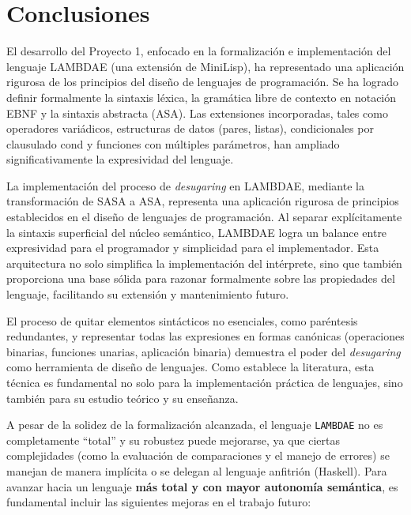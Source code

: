 \documentclass[a4paper,12pt]{article}
\begin{document}

\newpage

\section{Conclusiones}

\begin{tcolorbox}[title= Conclusiones     MÓDULO D3, breakable]
    El desarrollo del Proyecto 1, enfocado en la formalización e implementación del lenguaje LAMBDAE (una extensión de MiniLisp), ha representado una aplicación rigurosa de los principios del diseño de lenguajes de programación. Se ha logrado definir formalmente la sintaxis léxica, la gramática libre de contexto en notación EBNF y la sintaxis abstracta (ASA). Las extensiones incorporadas, tales como operadores variádicos, estructuras de datos (pares, listas), condicionales por clausulado cond y funciones con múltiples parámetros, han ampliado significativamente la expresividad del lenguaje.


La implementación del proceso de \textit{desugaring} en \textsc{LAMBDAE}, mediante la transformación de SASA a ASA, representa una aplicación rigurosa de principios establecidos en el diseño de lenguajes de programación. Al separar explícitamente la sintaxis superficial del núcleo semántico, \textsc{LAMBDAE} logra un balance entre expresividad para el programador y simplicidad para el implementador. Esta arquitectura no solo simplifica la implementación del intérprete, sino que también proporciona una base sólida para razonar formalmente sobre las propiedades del lenguaje, facilitando su extensión y mantenimiento futuro.

El proceso de quitar elementos sintácticos no esenciales, como paréntesis redundantes, y representar todas las expresiones en formas canónicas (operaciones binarias, funciones unarias, aplicación binaria) demuestra el poder del \textit{desugaring} como herramienta de diseño de lenguajes. Como establece la literatura, esta técnica es fundamental no solo para la implementación práctica de lenguajes, sino también para su estudio teórico y su enseñanza.\cite{Krishnamurthi2015}


A pesar de la solidez de la formalización alcanzada, el lenguaje \texttt{LAMBDAE} no es completamente ``total'' y su robustez puede mejorarse, ya que ciertas complejidades (como la evaluación de comparaciones y el manejo de errores) se manejan de manera implícita o se delegan al lenguaje anfitrión (Haskell). Para avanzar hacia un lenguaje \textbf{más total y con mayor autonomía semántica}, es fundamental incluir las siguientes mejoras en el trabajo futuro:


\end{tcolorbox}
\end{document}
